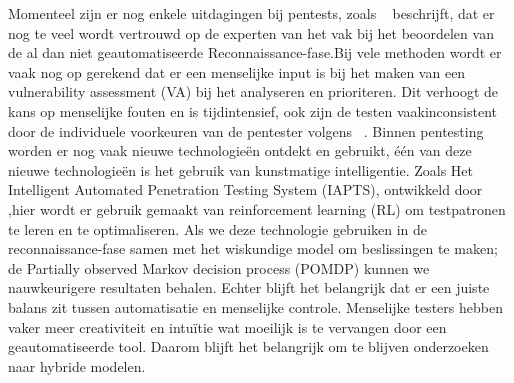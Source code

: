Momenteel zijn er nog enkele uitdagingen bij pentests, zoals ~\textcite{Fugkeaw} beschrijft, dat er nog te veel wordt vertrouwd op de experten van het vak bij het beoordelen van de al dan niet geautomatiseerde Reconnaissance-fase.Bij vele methoden wordt er vaak nog op gerekend dat er een menselijke input is bij het maken van een vulnerability assessment (VA) bij het analyseren en prioriteren. Dit verhoogt de kans op menselijke fouten en is tijdintensief, ook zijn de testen vaakinconsistent door de individuele voorkeuren van de pentester volgens ~\textcite{Ghanem}.
Binnen pentesting worden er nog vaak nieuwe technologieën ontdekt en gebruikt, één van deze nieuwe technologieën is het gebruik van kunstmatige intelligentie. Zoals Het Intelligent Automated Penetration Testing System (IAPTS), ontwikkeld door \textcite{Ghanem},hier wordt er gebruik gemaakt van reinforcement learning (RL) om testpatronen te leren en te optimaliseren. Als we deze technologie gebruiken in de reconnaissance-fase samen met het wiskundige model om beslissingen te maken; de Partially observed Markov decision process (POMDP) kunnen we nauwkeurigere resultaten behalen. Echter blijft het belangrijk dat er een juiste balans zit tussen automatisatie en menselijke controle. Menselijke testers hebben vaker meer creativiteit en intuïtie wat moeilijk is te vervangen door een geautomatiseerde tool. Daarom blijft het belangrijk om te blijven onderzoeken naar hybride modelen.








